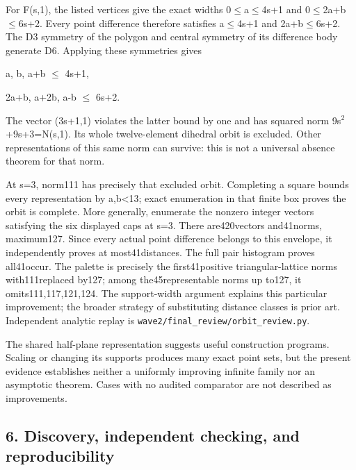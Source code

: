 \documentclass[
]{article}
\begin{document}
For F(s,1), the listed vertices give the exact widths 0\ensuremath{\le}a\ensuremath{\le}4s+1 and
0\ensuremath{\le}2a+b\ensuremath{\le}6s+2. Every point difference therefore satisfies
\textbar a\textbar\ensuremath{\le}4s+1 and \textbar2a+b\textbar\ensuremath{\le}6s+2. The D3 symmetry
of the polygon and central symmetry of its difference body generate D6.
Applying these symmetries gives

\textbar a\textbar, \textbar b\textbar, \textbar a+b\textbar{} \ensuremath{\le} 4s+1,

\textbar2a+b\textbar, \textbar a+2b\textbar, \textbar a-b\textbar{} \ensuremath{\le}
6s+2.

The vector (3s+1,1) violates the latter bound by one and has squared
norm 9s\ensuremath{{}^2}+9s+3=N(s,1). Its whole twelve-element dihedral orbit is
excluded. Other representations of this same norm can survive: this is
not a universal absence theorem for that norm.

At s=3, norm111 has precisely that excluded orbit. Completing a square
bounds every representation by
\textbar a\textbar,\textbar b\textbar\textless13; exact enumeration in
that finite box proves the orbit is complete. More generally, enumerate
the nonzero integer vectors satisfying the six displayed caps at s=3.
There are420vectors and41norms, maximum127. Since every actual point
difference belongs to this envelope, it independently proves at
most41distances. The full pair histogram proves all41occur. The palette
is precisely the first41positive triangular-lattice norms
with111replaced by127; among the45representable norms up to127, it
omits111,117,121,124. The support-width argument explains this
particular improvement; the broader strategy of substituting distance
classes is prior art. Independent analytic replay is
\texttt{wave2/final\_review/orbit\_review.py}.

The shared half-plane representation suggests useful construction
programs. Scaling or changing its supports produces many exact point
sets, but the present evidence establishes neither a uniformly improving
infinite family nor an asymptotic theorem. Cases with no audited
comparator are not described as improvements.

\subsection{6. Discovery, independent checking, and
reproducibility}\label{discovery-independent-checking-and-reproducibility}
\end{document}
